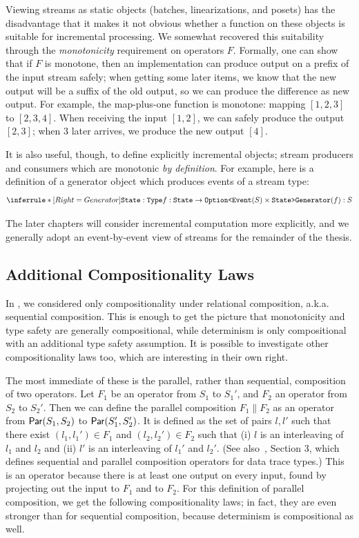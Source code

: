 Viewing streams as static objects (batches, linearizations, and posets)
has the disadvantage that it makes it not obvious whether a function on these objects is suitable for incremental processing.
We somewhat recovered this suitability through the \emph{monotonicity} requirement on operators $F$.
Formally, one can show that if $F$ is monotone, then an implementation can
produce output on a prefix of the input stream safely; when getting some later items, we know that the new output will be a suffix of the old output, so we can produce the difference as new output. For example, the map-plus-one function is monotone: mapping $[1, 2, 3]$ to $[2, 3, 4]$. When receiving the input $[1, 2]$, we can safely produce the output $[2, 3]$; when $3$ later arrives, we produce the new output $[4]$.

It is also useful, though, to define explicitly incremental objects; stream producers and consumers which are monotonic \emph{by definition}.
For example, here is a definition of a generator object which produces events of a stream type:
\[
\inference[Generator]
{
  \texttt{State}: \texttt{Type} \\
  f: \texttt{State} \to \texttt{Option<}\texttt{Event}(S) \times \texttt{State>}
}
{
  \texttt{Generator}(f): S
}
\]

The later chapters will consider incremental computation more explicitly, and we generally adopt an event-by-event view of streams for the remainder of the thesis.

\subsection{Additional Compositionality Laws}
\label{sec:additional-compositionality-laws}

In , we considered only compositionality under relational composition, a.k.a. sequential composition. This is enough to get the picture that monotonicity and type safety are generally compositional, while determinism is only compositional with an additional type safety assumption.
It is possible to investigate other compositionality laws too, which are interesting in their own right.

The most immediate of these is the parallel, rather than sequential, composition of two operators. Let $F_1$ be an operator from $S_1$ to $S_1'$, and $F_2$ an operator from $S_2$ to $S_2'$.
Then we can define the parallel composition $F_1 \| F_2$ as
an operator from $\mathsf{Par}({S_1}, {S_2})$ to $\mathsf{Par}({S_1'}, {S_2'})$.
It is defined as the set of pairs $l, l'$ such that there exist $(l_1, l_1') \in F_1$ and $(l_2, l_2') \in F_2$ such that (i) $l$ is an interleaving of $l_1$ and $l_2$ and (ii) $l'$ is an interleaving of $l_1'$ and $l_2'$.
(See also~, Section 3, which defines sequential and parallel composition operators for data trace types.)
This is an operator because there is at least one output on every input, found by projecting out the input to $F_1$ and to $F_2$.
For this definition of parallel composition, we get the following compositionality laws; in fact, they are even stronger than for sequential composition,
because determinism is compositional as well.


